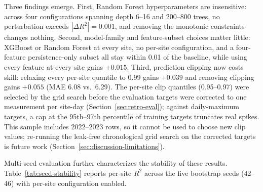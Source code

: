 \documentclass[toxins,article,submit,moreauthors]{Definitions/mdpi}
\begin{document}
Three findings emerge. First, Random Forest hyperparameters are insensitive: across four configurations spanning depth 6--16 and 200--800 trees, no perturbation exceeds $|\Delta R^2| = 0.001$, and removing the monotonic constraints changes nothing. Second, model-family and feature-subset choices matter little: XGBoost or Random Forest at every site, no per-site configuration, and a four-feature persistence-only subset all stay within 0.01 of the baseline, while using every feature at every site gains $+0.015$. Third, prediction clipping now costs skill: relaxing every per-site quantile to 0.99 gains $+0.039$ and removing clipping gains $+0.055$ (MAE 6.08 vs.\ 6.29). The per-site clip quantiles (0.95--0.97) were selected by the grid search before the evaluation targets were corrected to one measurement per site-day (Section~\ref{sec:retro-eval}); against daily-maximum targets, a cap at the 95th--97th percentile of training targets truncates real spikes. This sample includes 2022--2023 rows, so it cannot be used to choose new clip values; re-running the leak-free chronological grid search on the corrected targets is future work (Section~\ref{sec:discussion-limitations}).

Multi-seed evaluation further characterizes the stability of these results. Table~\ref{tab:seed-stability} reports per-site $R^2$ across the five bootstrap seeds (42--46) with per-site configuration enabled.
\end{document}
